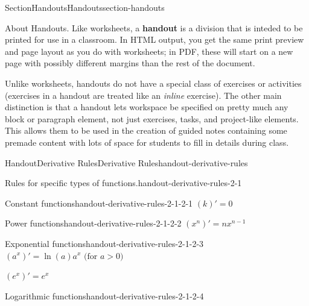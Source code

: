 \documentclass[twoside,10pt,]{article}
\newcommand{\terminology}[1]{\textbf{#1}}
\numberwithin{equation}{section}
\begin{document}
%
%
\typeout{************************************************}
\typeout{************************************************}
%
\begin{sectionptx}{Section}{Handouts}{}{Handouts}{}{}{section-handouts}
\begin{introduction}{About Handouts.}%
Like worksheets, a \terminology{handout} is a division that is inteded to be printed for use in a classroom. In HTML output, you get the same print preview and page layout as you do with worksheets; in PDF, these will start on a new page with possibly different margins than the rest of the document.%
\par
Unlike worksheets, handouts do not have a special class of exercises or activities (exercises in a handout are treated like an \emph{inline} exercise). The other main distinction is that a handout lets workspace be specified on pretty much any block or paragraph element, not just exercises, tasks, and project-like elements.  This allows them to be used in the creation of guided notes containing some premade content with lots of space for students to fill in details during class.%
\end{introduction}%
%
%
\typeout{************************************************}
\typeout{************************************************}
%
\begin{handout-subsection}{Handout}{Derivative Rules}{}{Derivative Rules}{}{}{handout-derivative-rules}
\begin{paragraphs}{Rules for specific types of functions.}{handout-derivative-rules-2-1}%
%
\begin{descriptionlist}
\begin{dlimedium}{Constant functions}{handout-derivative-rules-2-1-2-1}%
\(\displaystyle (k)' = 0\)%
\end{dlimedium}%
\begin{dlimedium}{Power functions}{handout-derivative-rules-2-1-2-2}%
\(\displaystyle (x^{n})' = nx^{n-1}\)%
\end{dlimedium}%
\begin{dlimedium}{Exponential functions}{handout-derivative-rules-2-1-2-3}%
\((a^{x})' = \ln(a) a^{x} \text{ (for } a>0\text{)}\)%
\par
\((e^{x})' = e^{x}\)%
\end{dlimedium}%
\begin{dlimedium}{Logarithmic functions}{handout-derivative-rules-2-1-2-4}%

\end{dlimedium}
\end{descriptionlist}
\end{paragraphs}
\end{handout-subsection}
\end{sectionptx}
\end{document}
